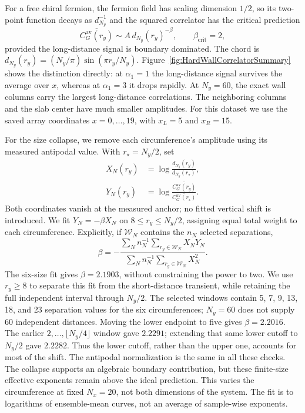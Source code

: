 For a free chiral fermion, the fermion field has scaling dimension $1/2$,
so its two-point function decays as $d_{N_y}^{-1}$ and the squared
correlator has the critical prediction
\begin{equation}
 \overline{C_G^{\mathrm{av}}(r_y)}\sim A\,d_{N_y}(r_y)^{-\beta},
 \qquad \beta_{\mathrm{crit}}=2,
 \label{eq:EndpointCorrelatorCriticalPrediction}
\end{equation}
provided the long-distance signal is boundary dominated.  The chord is
$d_{N_y}(r_y)=(N_y/\pi)\sin(\pi r_y/N_y)$.  Figure~\ref{fig:HardWallCorrelatorSummary}
shows the distinction directly: at $\alpha_1=1$ the long-distance signal
survives the average over $x$, whereas at $\alpha_1=3$ it drops rapidly.
At $N_y=60$, the exact wall columns carry the largest long-distance
correlations.  The neighboring columns and the slab center have much
smaller amplitudes.  For this dataset we use the saved array coordinates
$x=0,\ldots,19$, with $x_L=5$ and $x_R=15$.

For the size collapse, we remove each circumference's amplitude using its
measured antipodal value.  With $r_\star=N_y/2$, set
\begin{align}
 X_N(r_y)&=\log\frac{d_{N_y}(r_y)}{d_{N_y}(r_\star)},
 \nonumber\\
 Y_N(r_y)&=\log\frac{\overline{C_G^{\mathrm{av}}(r_y)}}
                         {\overline{C_G^{\mathrm{av}}(r_\star)}}.
 \label{eq:EndpointCorrelatorCollapse}
\end{align}
Both coordinates vanish at the measured anchor; no fitted vertical shift
is introduced.  We fit $Y_N=-\beta X_N$ on
$8\leq r_y\leq N_y/2$, assigning equal total weight to each
circumference.  Explicitly, if $\mathcal W_N$ contains the $n_N$ selected
separations,
\begin{equation}
 \beta=-\frac{\sum_N n_N^{-1}\sum_{r_y\in\mathcal W_N}X_NY_N}
                  {\sum_N n_N^{-1}\sum_{r_y\in\mathcal W_N}X_N^2}.
 \label{eq:EndpointCorrelatorJointFit}
\end{equation}
The six-size fit gives $\beta=2.1903$, without constraining the power to
two.  We use $r_y\geq8$ to separate this fit from the short-distance
transient, while retaining the full independent interval through $N_y/2$.
The selected windows contain 5, 7, 9, 13, 18, and 23 separation values for
the six circumferences; $N_y=60$ does not supply 60 independent distances.
Moving the lower endpoint to five gives $\beta=2.2016$.
The earlier $2,\ldots,\lfloor N_y/4\rfloor$ window gave $2.2291$;
extending that same lower cutoff to $N_y/2$ gave $2.2282$.
Thus the lower cutoff, rather than the upper one, accounts for most of
the shift.  The antipodal normalization is the same in all these checks.
The collapse supports an
algebraic boundary contribution, but these finite-size effective exponents
remain above the ideal prediction.  This varies the circumference at
fixed $N_x=20$, not both dimensions of the system.  The fit is to logarithms
of ensemble-mean curves, not an average of sample-wise exponents.

